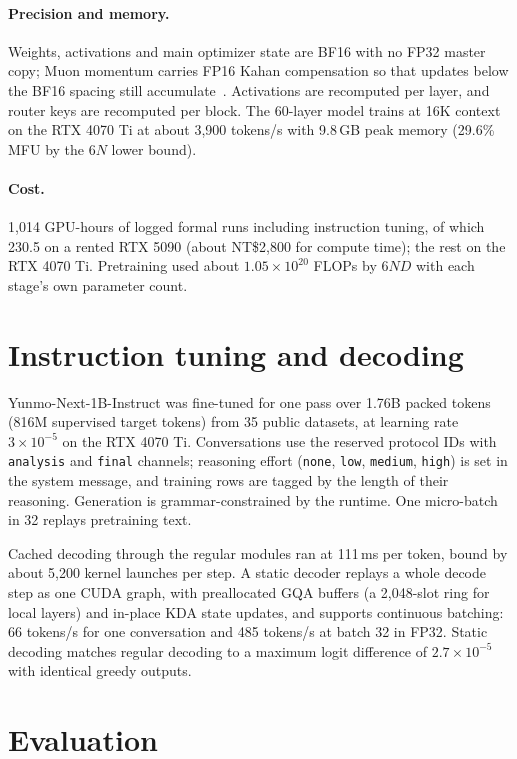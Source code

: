 \documentclass[11pt]{article}
\newcommand{\yn}{Yunmo-Next-1B}
\begin{document}
\paragraph{Precision and memory.} Weights, activations and main optimizer state are BF16 with no FP32 master
copy; Muon momentum carries FP16 Kahan compensation so that updates below the BF16 spacing still
accumulate~\cite{bf16kahan2020}. Activations are recomputed per layer, and router keys are recomputed per block.
The 60-layer model trains at 16K context on the RTX 4070 Ti at about 3,900 tokens/s with 9.8\,GB peak memory
(29.6\% MFU by the $6N$ lower bound).

\paragraph{Cost.} 1,014 GPU-hours of logged formal runs including instruction tuning, of which 230.5 on a rented
RTX 5090 (about NT\$2,800 for compute time); the rest on the RTX 4070 Ti. Pretraining used about
$1.05\times10^{20}$ FLOPs by $6ND$ with each stage's own parameter count.

\section{Instruction tuning and decoding}\label{sec:sft}

\yn{}-Instruct was fine-tuned for one pass over 1.76B packed tokens (816M supervised target tokens) from 35
public datasets, at learning rate $3\times10^{-5}$ on the RTX 4070 Ti. Conversations use the reserved protocol
IDs with \texttt{analysis} and \texttt{final} channels; reasoning effort (\texttt{none}, \texttt{low},
\texttt{medium}, \texttt{high}) is set in the system message, and training rows are tagged by the length of
their reasoning. Generation is grammar-constrained by the runtime. One micro-batch in 32 replays pretraining
text.

Cached decoding through the regular modules ran at 111\,ms per token, bound by about 5,200 kernel launches per
step. A static decoder replays a whole decode step as one CUDA graph, with preallocated GQA buffers (a 2,048-slot
ring for local layers) and in-place KDA state updates, and supports continuous batching: 66 tokens/s for one
conversation and 485 tokens/s at batch 32 in FP32. Static decoding matches regular decoding to a maximum logit
difference of $2.7\times10^{-5}$ with identical greedy outputs.

\section{Evaluation}\label{sec:eval}
\end{document}
